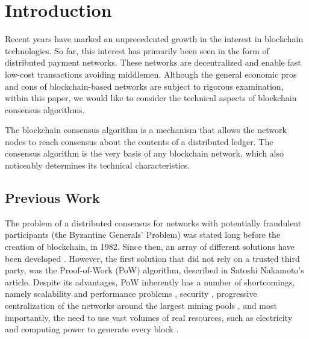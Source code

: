 \documentclass[a4paper,12pt]{article}
\begin{document}
\section{Introduction}

Recent years have marked an unprecedented growth in the interest in blockchain technologies. So far, this interest has primarily been seen in the form of distributed payment networks. These networks are decentralized and enable fast low-cost transactions avoiding middlemen. Although the general economic pros and cons of blockchain-based networks are subject to rigorous examination, within this paper, we would like to consider the technical aspects of blockchain consensus algorithms.

The blockchain consensus algorithm is a mechanism that allows the network nodes to reach consensus about the contents of a distributed ledger. The consensus algorithm is the very basis of any blockchain network, which also noticeably determines its technical characteristics.

% 

\subsection{Previous Work}

The problem of a distributed consensus for networks with potentially fraudulent participants (the Byzantine Generals' Problem) was stated long before the creation of blockchain, in 1982. \cite{Lamport} Since then, an array of different solutions have been developed \cite{Castro}. However, the first solution that did not rely on a trusted third party, was the Proof-of-Work (PoW) algorithm, described in Satoshi Nakamoto's article. \cite{satoshi} Despite its advantages, PoW inherently has a number of shortcomings, namely scalability and performance problems \cite{Croman}, security \cite{Eyal}, progressive centralization of the networks around the largest mining pools \cite{Buterin}, and most importantly, the need to use vast volumes of real resources, such as electricity and computing power to generate every block \cite{Bentov}. 
\end{document}
